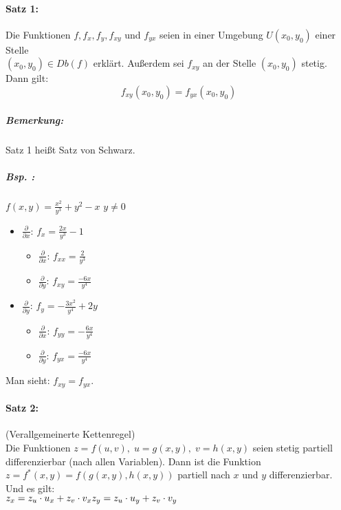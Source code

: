 \paragraph{Satz 1:} Die Funktionen $f, f_x, f_y, f_{xy}$ und $f_{yx}$ seien in einer Umgebung $U(x_0,y_0)$ einer Stelle \\
$(x_0,y_0) \in Db(f)$ erklärt. Außerdem sei  $f_{xy}$ an der Stelle $(x_0,y_0)$ stetig. Dann gilt: $$\boxed{f_{xy}(x_0,y_0)=f_{yx}(x_0,y_0)}$$
\subparagraph{Bemerkung:} Satz 1 heißt Satz von Schwarz.
\subparagraph{Bsp. :} $f(x,y) = \frac{x^2}{y^3}+y^2-x$ \quad $y\not = 0$
\begin{itemize}
\item $\frac{\partial}{\partial x}$: $f_x=\frac{2x}{y^3}-1$
\begin{itemize}
\item $\frac{\partial}{\partial x}$: $f_{xx}=\frac{2}{y^3}$
\item $\frac{\partial}{\partial y}$: $f_{xy}=\frac{-6x}{y^4}$
\end{itemize}
\item $\frac{\partial}{\partial y}$: $f_y=-\frac{3x^2}{y^4}+2y$
\begin{itemize}
\item $\frac{\partial}{\partial x}$: $f_{yy}=-\frac{6x}{y^4}$
\item $\frac{\partial}{\partial y}$: $f_{yx}=\frac{-6x}{y^4}$
\end{itemize}
\end{itemize}
Man sieht: $f_{xy}=f_{yx}$.

\paragraph{Satz 2:} (Verallgemeinerte Kettenregel)\\
Die Funktionen $z=f(u,v), \; u=g(x,y), \; v=h(x,y)$ seien stetig partiell differenzierbar (nach allen Variablen). Dann ist die Funktion $z=f^*(x,y)=f(g(x,y), h(x,y))$ partiell nach $x$ und $y$ differenzierbar. Und es gilt:\\
$z_x=z_u\cdot u_x + z_v \cdot v_x\\
z_y=z_u \cdot u_y + z_v \cdot v_y$

